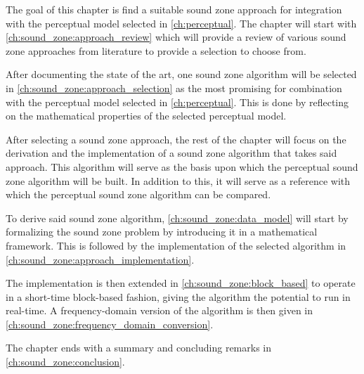 The goal of this chapter is find a suitable sound zone approach for integration with the perceptual model selected in \autoref{ch:perceptual}.
The chapter will start with \autoref{ch:sound_zone:approach_review} which will provide a review of various sound zone approaches from literature to provide a selection to choose 
from.

After documenting the state of the art, one sound zone algorithm will be selected in \autoref{ch:sound_zone:approach_selection} as the most promising 
for combination with the perceptual model selected in \autoref{ch:perceptual}.
This is done by reflecting on the mathematical properties of the selected perceptual model.

After selecting a sound zone approach, the rest of the chapter will focus on the derivation and the implementation of a sound zone algorithm that takes 
said approach.
This algorithm will serve as the basis upon which the perceptual sound zone algorithm will be built.
In addition to this, it will serve as a reference with which the perceptual sound zone algorithm can be compared.

To derive said sound zone algorithm, \autoref{ch:sound_zone:data_model} will start by formalizing the sound zone problem by introducing it in a 
mathematical framework.
This is followed by the implementation of the selected algorithm in \autoref{ch:sound_zone:approach_implementation}.

The implementation is then extended in \autoref{ch:sound_zone:block_based} to operate in a short-time block-based fashion, 
giving the algorithm the potential to run in real-time.
A frequency-domain version of the algorithm is then given in \autoref{ch:sound_zone:frequency_domain_conversion}.

The chapter ends with a summary and concluding remarks in \autoref{ch:sound_zone:conclusion}.
